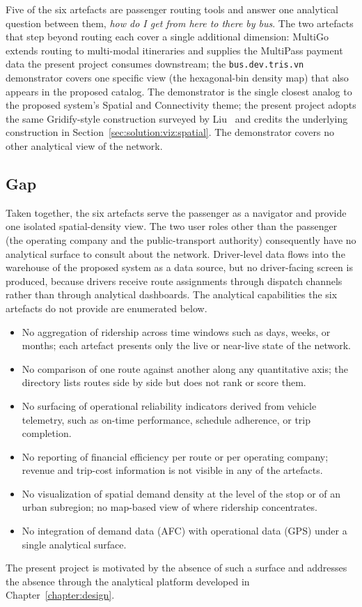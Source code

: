 Five of the six artefacts are passenger routing tools and answer one
analytical question between them, \textit{how do I get from here to
there by bus}. The two artefacts that step beyond routing each cover a
single additional dimension: MultiGo extends routing to multi-modal
itineraries and supplies the MultiPass payment data the present project
consumes downstream; the \texttt{bus.dev.tris.vn} demonstrator covers
one specific view (the hexagonal-bin density map) that also appears in
the proposed catalog. The demonstrator is the single closest analog
to the proposed system's Spatial and Connectivity theme; the present
project adopts the same Gridify-style construction surveyed by
Liu~\cite{liu2022} and credits the underlying construction in
Section~\ref{sec:solution:viz:spatial}. The demonstrator covers no
other analytical view of the network.

\subsection{Gap}
\label{sec:related:tools:gap}

Taken together, the six artefacts serve the passenger as a navigator
and provide one isolated spatial-density view. The two user roles
other than the passenger (the operating company and the
public-transport authority) consequently have no analytical surface to
consult about the network. Driver-level data flows into the warehouse
of the proposed system as a data source, but no driver-facing screen
is produced, because drivers receive route assignments through
dispatch channels rather than through analytical dashboards. The
analytical capabilities the six artefacts do not provide are
enumerated below.

\begin{itemize}
  \item No aggregation of ridership across time windows such as days,
        weeks, or months; each artefact presents only the live or
        near-live state of the network.
  \item No comparison of one route against another along any
        quantitative axis; the directory lists routes side by side
        but does not rank or score them.
  \item No surfacing of operational reliability indicators derived
        from vehicle telemetry, such as on-time performance,
        schedule adherence, or trip completion.
  \item No reporting of financial efficiency per route or per
        operating company; revenue and trip-cost information is not
        visible in any of the artefacts.
  \item No visualization of spatial demand density at the level of
        the stop or of an urban subregion; no map-based view of
        where ridership concentrates.
  \item No integration of demand data (AFC) with operational data
        (GPS) under a single analytical surface.
\end{itemize}

The present project is motivated by the absence of such a surface and
addresses the absence through the analytical platform developed in
Chapter~\ref{chapter:design}.
